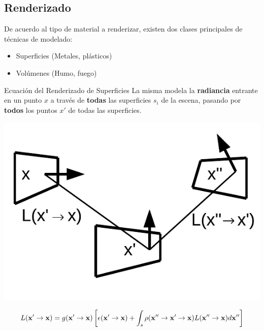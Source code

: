 \documentclass[spanish]{beamer}
\begin{document}
\subsection{Renderizado}

\begin{frame}
De acuerdo al tipo de material a renderizar, existen dos clases principales de técnicas de modelado:

\begin{block}{}
\begin{itemize}
\item Superficies (Metales, plásticos)
\item Volúmenes (Humo, fuego)
\end{itemize}
\end{block}
\end{frame}


\begin{frame}{Ecuación del Renderizado de Superficies}
La misma modela la \textbf{radiancia} entrante en un punto $x$ a través de \textbf{todas} las superficies $s_{i}$ de la escena, pasando por \textbf{todos} los puntos $x'$ de todas las superficies.

\centerline{\includegraphics[scale = 0.6]{../figures/rendequation}}
\vspace{-1cm}
$$ L(\bold{x'} \rightarrow \bold{x}) =  g(\bold{x'}  \rightarrow \bold{x})  \left[ \epsilon(\bold{x'}  \rightarrow \bold{x}) + \int_{s}{\rho(\bold{x''}  \rightarrow \bold{x'}  \rightarrow \bold{x})L(\bold{x''}  \rightarrow \bold{x}) d\bold{x''}} \right] $$


\end{frame}
\end{document}
